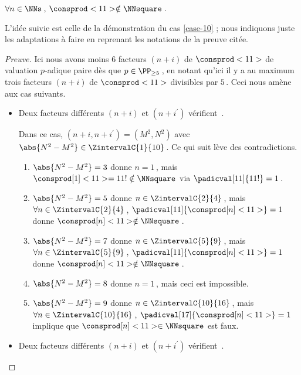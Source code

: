 \begin{fact} \label{case-11}
	 $\forall n \in \NNs$\,, $\consprod<11> \notin \NNsquare$\,.
\end{fact}




L'idée suivie est celle de la démonstration du cas \ref{case-10} ; nous indiquons juste les adaptations à faire en reprenant les notations de la preuve citée.


\begin{proof}[Preuve]%
    Ici nous avons moins $6$ facteurs $(n + i)$ de $\consprod<11>$ de valuation $p$-adique paire dès que $p \in \PP_{\geq 5}$\,, en notant qu'ici il y a au maximum trois facteurs $(n + i)$ de $\consprod<11>$ divisibles par $5$\,. Ceci nous amène aux cas suivants.
    \begin{itemize}
    	\medskip
		\item Deux facteurs différents $(n+i)$ et $(n+i^\prime)$ vérifient \,.
		
		\smallskip
		\noindent
		Dans ce cas, $(n+i, n+i^\prime) = (M^2, N^2)$ avec $\abs{N^2 - M^2} \in \ZintervalC{1}{10}$\,. Ce qui suit lève des contradictions.
		\begin{enumerate}
			\item $\abs{N^2 - M^2} = 3$ donne $n = 1$\,, mais $\consprod[1]<11> = 11 ! \notin \NNsquare$ via $\padicval[11]{11!} = 1$\,.


			\item $\abs{N^2 - M^2} = 5$ donne $n \in \ZintervalC{2}{4}$\,, mais $\forall n \in \ZintervalC{2}{4}$\,, $\padicval[11]{\consprod[n]<11>} = 1$ donne $\consprod[n]<11> \notin \NNsquare$\,.
			

			\item $\abs{N^2 - M^2} = 7$ donne $n \in \ZintervalC{5}{9}$\,, mais $\forall n \in \ZintervalC{5}{9}$\,, $\padicval[11]{\consprod[n]<11>} = 1$ donne $\consprod[n]<11> \notin \NNsquare$\,.


			\item $\abs{N^2 - M^2} = 8$ donne $n = 1$\,, mais ceci est impossible.

			\item $\abs{N^2 - M^2} = 9$ donne $n \in \ZintervalC{10}{16}$\,, mais $\forall n \in \ZintervalC{10}{16}$\,, $\padicval[17]{\consprod[n]<11>} = 1$ implique que $\consprod[n]<11> \in \NNsquare$ est faux.
		\end{enumerate}


    	\medskip
		\item Deux facteurs différents $(n+i)$ et $(n+i^\prime)$ vérifient \,.
		

\end{itemize}
\end{proof}
